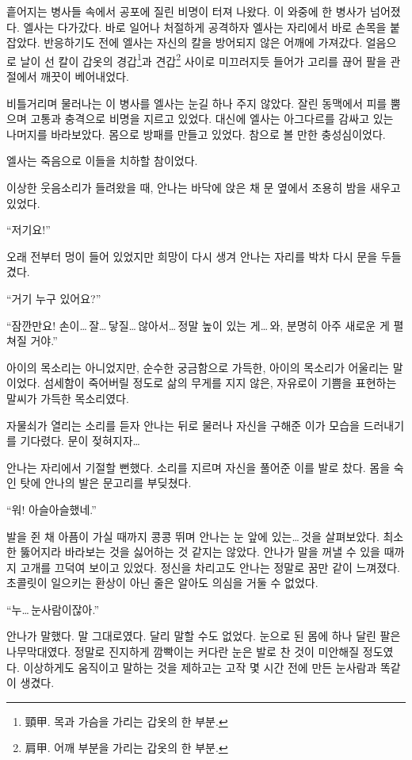 흩어지는 병사들 속에서 공포에 질린 비명이 터져 나왔다. 이 와중에 한 병사가 넘어졌다. 엘사는 다가갔다. 바로 일어나 처절하게 공격하자 엘사는 자리에서 바로 손목을 붙잡았다. 반응하기도 전에 엘사는 자신의 칼을 방어되지 않은 어깨에 가져갔다. 얼음으로 날이 선 칼이 갑옷의 경갑\footnote{頸甲. 목과 가슴을 가리는 갑옷의 한 부분.}과 견갑\footnote{肩甲. 어깨 부분을 가리는 갑옷의 한 부분.} 사이로 미끄러지듯 들어가 고리를 끊어 팔을 관절에서 깨끗이 베어내었다.

비틀거리며 물러나는 이 병사를 엘사는 눈길 하나 주지 않았다. 잘린 동맥에서 피를 뿜으며 고통과 충격으로 비명을 지르고 있었다. 대신에 엘사는 아그다르를 감싸고 있는 나머지를 바라보았다. 몸으로 방패를 만들고 있었다. 참으로 볼 만한 충성심이었다.

엘사는 죽음으로 이들을 치하할 참이었다.

\textbreak

이상한 웃음소리가 들려왔을 때, 안나는 바닥에 앉은 채 문 옆에서 조용히 밤을 새우고 있었다.

``저기요!''

오래 전부터 멍이 들어 있었지만 희망이 다시 생겨 안나는 자리를 박차 다시 문을 두들겼다.

``거기 누구 있어요?''

``잠깐만요! 손이\ldots\,잘\ldots\,닿질\ldots\,않아서\ldots\,정말 높이 있는 게\ldots\,와, 분명히 아주 새로운 게 펼쳐질 거야.''

아이의 목소리는 아니었지만, 순수한 궁금함으로 가득한, 아이의 목소리가 어울리는 말이었다. 섬세함이 죽어버릴 정도로 삶의 무게를 지지 않은, 자유로이 기쁨을 표현하는 말씨가 가득한 목소리였다.

자물쇠가 열리는 소리를 듣자 안나는 뒤로 물러나 자신을 구해준 이가 모습을 드러내기를 기다렸다. 문이 젖혀지자\ldots

안나는 자리에서 기절할 뻔했다. 소리를 지르며 자신을 풀어준 이를 발로 찼다. 몸을 숙인 탓에 안나의 발은 문고리를 부딪쳤다.

``워! 아슬아슬했네.''

발을 쥔 채 아픔이 가실 때까지 콩콩 뛰며 안나는 눈 앞에 있는\ldots\,것을 살펴보았다. 최소한 뚫어지라 바라보는 것을 싫어하는 것 같지는 않았다. 안나가 말을 꺼낼 수 있을 때까지 고개를 끄덕여 보이고 있었다. 정신을 차리고도 안나는 정말로 꿈만 같이 느껴졌다. 초콜릿이 일으키는 환상이 아닌 줄은 알아도 의심을 거둘 수 없었다.

``누\ldots\,눈사람이잖아.''

안나가 말했다. 말 그대로였다. 달리 말할 수도 없었다. 눈으로 된 몸에 하나 달린 팔은 나무막대였다. 정말로 진지하게 깜빡이는 커다란 눈은 발로 찬 것이 미안해질 정도였다. 이상하게도 움직이고 말하는 것을 제하고는 고작 몇 시간 전에 만든 눈사람과 똑같이 생겼다.

